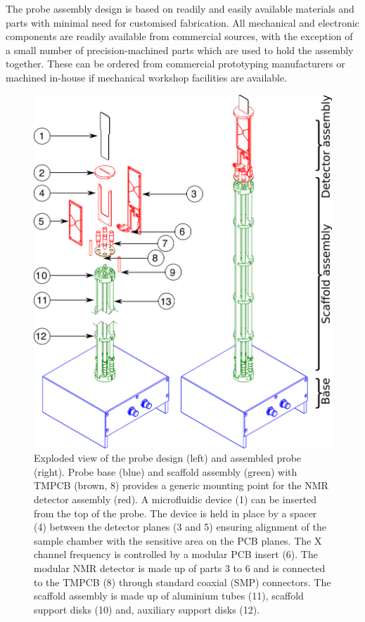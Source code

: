 \documentclass[preprint,5p]{elsarticle}
\begin{document}
The probe assembly design is based on readily and easily available materials and parts 
with minimal need for customised fabrication.
All mechanical and electronic components are readily available from commercial sources, 
with the exception of a small number of precision-machined parts which are used 
to hold the assembly together. These can be ordered from commercial prototyping 
manufacturers or machined in-house if mechanical workshop facilities are available.

\begin{figure}
\centering
\includegraphics[width=.7\linewidth,keepaspectratio=true]{./figures/ms5n17-tlp-im-181007-Probe-explode.png} 
\caption{Exploded view of the probe design (left) and assembled probe (right). 
Probe base (blue) and scaffold assembly (green) with TMPCB (brown, 8) provides a 
generic mounting point for the NMR detector assembly (red). 
A microfluidic device (1) can be inserted from the top of the probe. 
The device is held in place by a spacer (4) between the detector planes (3 and 5) 
ensuring alignment of the sample chamber with the sensitive area on the PCB planes. 
The X channel frequency is controlled by a 
modular PCB insert (6). The modular NMR detector is made up of parts 3 to 6 and is 
connected to the TMPCB (8) through standard coaxial (SMP) connectors. 
The scaffold assembly is made up of aluminium tubes (11), scaffold support disks (10) 
and, auxiliary support disks (12).}
\label{fig:probe-explode} 
\end{figure}
\end{document}
